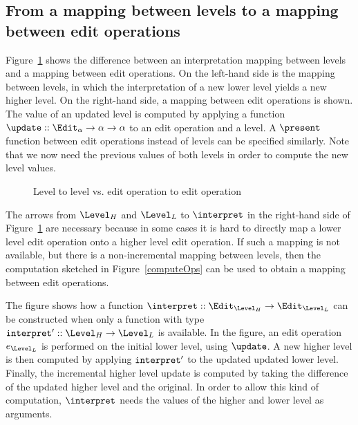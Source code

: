 %																
\subsection{From a mapping between levels to a mapping between edit operations}

Figure~\ref{fromLevelToOp} shows the difference between an interpretation mapping between levels and a mapping between edit operations. On the left-hand side is the mapping between levels, in which the interpretation of a new lower level yields a new higher level. On the right-hand side, a mapping between edit operations is shown. The value of an updated level is computed by applying a function
 $\update :: \Edit_\alpha \rightarrow \alpha \rightarrow \alpha$ to an edit operation and a level. A 
 $\present$ function between edit operations instead of levels can be specified similarly.  Note that we now need the previous values of both levels in order to compute the new level values.
 

\begin{figure}\begin{small}\begin{center}\begin{center}
\end{center}
\caption{Level to level vs. edit operation to edit operation }\label{fromLevelToOp} 
\end{center}\end{small}\end{figure}


The arrows from $\Level_{H}$ and $\Level_{L}$ to $\interpret$ in the right-hand side of Figure~\ref{fromLevelToOp} are necessary because in some cases it is hard to directly map a lower level edit operation onto a higher level edit operation.  If such a mapping is not available, but there is a non-incremental mapping between levels, then the computation sketched in Figure~\ref{computeOps} can be used to obtain a mapping between edit operations. 

The figure shows how a function $\interpret :: \Edit_{\Level_{H}} \rightarrow \Edit_{\Level_{L}}$ can be constructed when only a function with type ${\tt interpret'} :: \Level_{H} \rightarrow \Level_{L}$  is available. In the figure, an edit operation $e_{\Level_L}$ is performed on the initial lower level, using $\update$. A new higher level is then computed by applying ${\tt interpret'}$ to the updated updated lower level. Finally, the incremental higher level update is computed by taking the difference of the updated higher level and the original. In order to allow this kind of computation, $\interpret$ needs the values of the higher and lower level as arguments.


